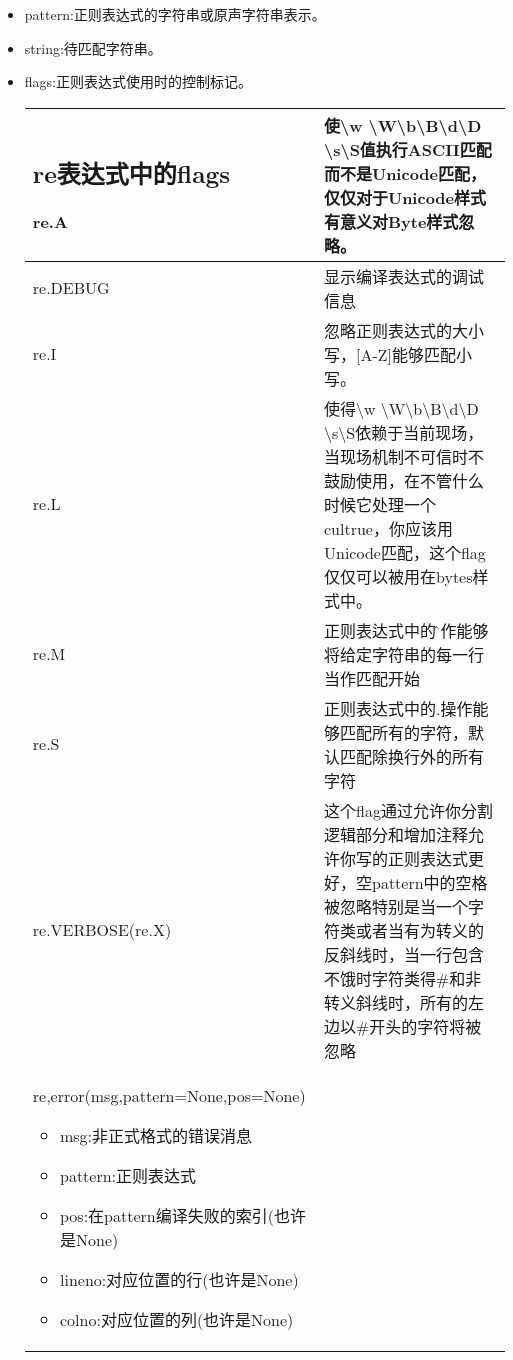 \documentclass{book}
\begin{document}
\begin{itemize}
\item pattern:正则表达式的字符串或原声字符串表示。
\item string:待匹配字符串。
\item flags:正则表达式使用时的控制标记。\newline
\begin{tabular}{|p{4cm}|p{10cm}|}
\hline
\subsection{re表达式中的flags}
re.A&使\textbackslash w \textbackslash W\textbackslash b\textbackslash B\textbackslash d\textbackslash D
\textbackslash s\textbackslash S值执行ASCII匹配而不是Unicode匹配，仅仅对于Unicode样式有意义对Byte样式忽略。\\
\hline
re.DEBUG&显示编译表达式的调试信息\\
\hline
re.I &忽略正则表达式的大小写，[A-Z]能够匹配小写。\\
\hline
re.L &使得\textbackslash w \textbackslash W\textbackslash b\textbackslash B\textbackslash d\textbackslash D
\textbackslash s\textbackslash S依赖于当前现场，当现场机制不可信时不鼓励使用，在不管什么时候它处理一个cultrue，你应该用Unicode匹配，这个flag仅仅可以被用在bytes样式中。\\
\hline
re.M &正则表达式中的\^操作能够将给定字符串的每一行当作匹配开始\\
\hline
re.S &正则表达式中的.操作能够匹配所有的字符，默认匹配除换行外的所有字符\\
re.VERBOSE(re.X)&这个flag通过允许你分割逻辑部分和增加注释允许你写的正则表达式更好，空pattern中的空格被忽略特别是当一个字符类或者当有为转义的反斜线时，当一行包含不饿时字符类得\#和非转义斜线时，所有的左边以\#开头的字符将被忽略\\
\hline
\hline
re,error(msg,pattern=None,pos=None)\newline
\begin{itemize}
\item msg:非正式格式的错误消息
\item pattern:正则表达式
\item pos:在pattern编译失败的索引(也许是None)
\item lineno:对应位置的行(也许是None)
\item colno:对应位置的列(也许是None)
\end{itemize}
\end{tabular}
\end{itemize}
\end{document}
